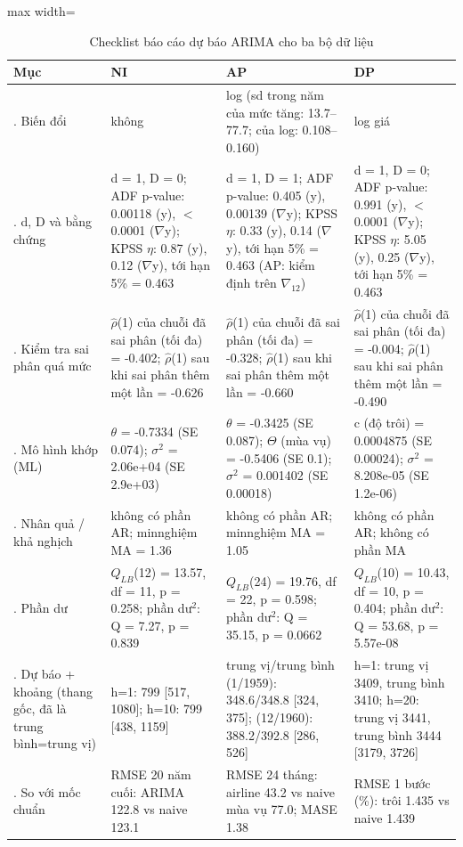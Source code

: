 \begin{table}[H]
\centering\small
\caption{Checklist báo cáo dự báo ARIMA cho ba bộ dữ liệu}\label{tab:tab_b12_14_checklist}
\begin{adjustbox}{max width=\linewidth}
\begin{tabular}{>{\raggedright\arraybackslash}p{}>{\raggedright\arraybackslash}p{}>{\raggedright\arraybackslash}p{}>{\raggedright\arraybackslash}p{}}
\toprule
Mục & NI & AP & DP \\
\midrule
1. Biến đổi & không & log (sd trong năm của mức tăng: 13.7–77.7; của log: 0.108–0.160) & log giá \\[12pt]
2. d, D và bằng chứng & d = 1, D = 0; ADF p-value: 0.00118 (y), $<$0.0001 ($\nabla$y); KPSS $\eta$: 0.87 (y), 0.12 ($\nabla$y), tới hạn 5\% = 0.463 & d = 1, D = 1; ADF p-value: 0.405 (y), 0.00139 ($\nabla$y); KPSS $\eta$: 0.33 (y), 0.14 ($\nabla$y), tới hạn 5\% = 0.463 (AP: kiểm định trên $\nabla_{12}$) & d = 1, D = 0; ADF p-value: 0.991 (y), $<$0.0001 ($\nabla$y); KPSS $\eta$: 5.05 (y), 0.25 ($\nabla$y), tới hạn 5\% = 0.463 \\[12pt]
3. Kiểm tra sai phân quá mức & $\hat{\rho}$(1) của chuỗi đã sai phân (tối đa) = -0.402; $\hat{\rho}$(1) sau khi sai phân thêm một lần = -0.626 & $\hat{\rho}$(1) của chuỗi đã sai phân (tối đa) = -0.328; $\hat{\rho}$(1) sau khi sai phân thêm một lần = -0.660 & $\hat{\rho}$(1) của chuỗi đã sai phân (tối đa) = -0.004; $\hat{\rho}$(1) sau khi sai phân thêm một lần = -0.490 \\[12pt]
4. Mô hình khớp (ML) & $\theta$ = -0.7334 (SE 0.074); $\sigma^{2}$ = 2.06e+04 (SE 2.9e+03) & $\theta$ = -0.3425 (SE 0.087); $\Theta$ (mùa vụ) = -0.5406 (SE 0.1); $\sigma^{2}$ = 0.001402 (SE 0.00018) & c (độ trôi) = 0.0004875 (SE 0.00024); $\sigma^{2}$ = 8.208e-05 (SE 1.2e-06) \\[12pt]
5. Nhân quả / khả nghịch & không có phần AR; min\textbar{}nghiệm MA\textbar{} = 1.36 & không có phần AR; min\textbar{}nghiệm MA\textbar{} = 1.05 & không có phần AR; không có phần MA \\[12pt]
6. Phần dư & $Q_{LB}$(12) = 13.57, df = 11, p = 0.258; phần dư$^{2}$: Q = 7.27, p = 0.839 & $Q_{LB}$(24) = 19.76, df = 22, p = 0.598; phần dư$^{2}$: Q = 35.15, p = 0.0662 & $Q_{LB}$(10) = 10.43, df = 10, p = 0.404; phần dư$^{2}$: Q = 53.68, p = 5.57e-08 \\[12pt]
7. Dự báo + khoảng (thang gốc, đã là trung bình=trung vị) & h=1: 799 [517, 1080]; h=10: 799 [438, 1159] & trung vị/trung bình (1/1959): 348.6/348.8 [324, 375]; (12/1960): 388.2/392.8 [286, 526] & h=1: trung vị 3409, trung bình 3410; h=20: trung vị 3441, trung bình 3444 [3179, 3726] \\[12pt]
8. So với mốc chuẩn & RMSE 20 năm cuối: ARIMA 122.8 vs naive 123.1 & RMSE 24 tháng: airline 43.2 vs naive mùa vụ 77.0; MASE 1.38 & RMSE 1 bước (\%): trôi 1.435 vs naive 1.439 \\[12pt]
\bottomrule
\end{tabular}
\end{adjustbox}
\end{table}
